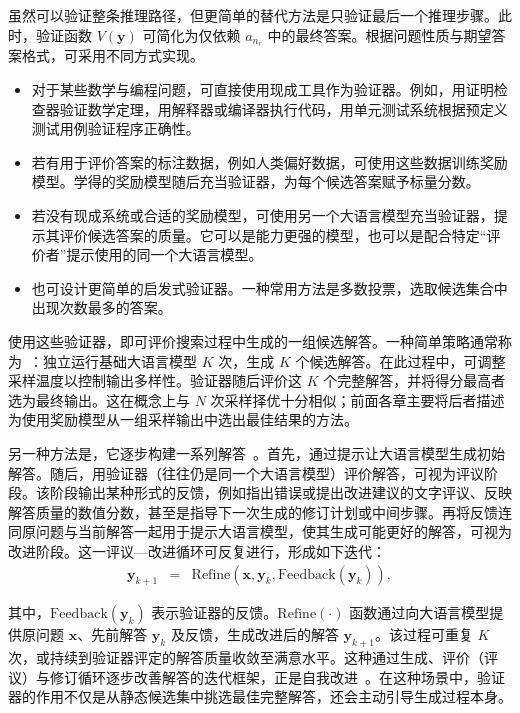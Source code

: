 虽然可以验证整条推理路径，但更简单的替代方法是只验证最后一个推理步骤。此时，验证函数 $V(\mathbf{y})$ 可简化为仅依赖 $a_{n_r}$ 中的最终答案。根据问题性质与期望答案格式，可采用不同方式实现。

\begin{itemize}
\item \vspace{0.5em} 对于某些数学与编程问题，可直接使用现成工具作为验证器。例如，用证明检查器验证数学定理，用解释器或编译器执行代码，用单元测试系统根据预定义测试用例验证程序正确性。
\item \vspace{0.3em} 若有用于评价答案的标注数据，例如人类偏好数据，可使用这些数据训练奖励模型。学得的奖励模型随后充当验证器，为每个候选答案赋予标量分数。
\item \vspace{0.3em} 若没有现成系统或合适的奖励模型，可使用另一个大语言模型充当验证器，提示其评价候选答案的质量。它可以是能力更强的模型，也可以是配合特定“评价者”提示使用的同一个大语言模型。
\item \vspace{0.3em} 也可设计更简单的启发式验证器。一种常用方法是多数投票，选取候选集合中出现次数最多的答案。
\end{itemize}
\vspace{0.3em}

使用这些验证器，即可评价搜索过程中生成的一组候选解答。一种简单策略通常称为~\cite{brown-etal:2024large,snell-etal:2024scaling}：独立运行基础大语言模型 $K$ 次，生成 $K$ 个候选解答。在此过程中，可调整采样温度以控制输出多样性。验证器随后评价这 $K$ 个完整解答，并将得分最高者选为最终输出。这在概念上与 $N$ 次采样择优十分相似；前面各章主要将后者描述为使用奖励模型从一组采样输出中选出最佳结果的方法。

另一种方法是，它逐步构建一系列解答~\cite{gou-etal:2024critic,zhang-etal:2024small}。首先，通过提示让大语言模型生成初始解答。随后，用验证器（往往仍是同一个大语言模型）评价解答，可视为评议阶段。该阶段输出某种形式的反馈，例如指出错误或提出改进建议的文字评议、反映解答质量的数值分数，甚至是指导下一次生成的修订计划或中间步骤。再将反馈连同原问题与当前解答一起用于提示大语言模型，使其生成可能更好的解答，可视为改进阶段。这一评议—改进循环可反复进行，形成如下迭代：
\begin{eqnarray}
\mathbf{y}_{k+1} & = & \mathrm{Refine}(\mathbf{x}, \mathbf{y}_k, \mathrm{Feedback}(\mathbf{y}_k)),
\end{eqnarray}

\noindent 其中，$\mathrm{Feedback}(\mathbf{y}_k)$ 表示验证器的反馈。$\mathrm{Refine}(\cdot)$ 函数通过向大语言模型提供原问题 $\mathbf{x}$、先前解答 $\mathbf{y}_k$ 及反馈，生成改进后的解答 $\mathbf{y}_{k+1}$。该过程可重复 $K$ 次，或持续到验证器评定的解答质量收敛至满意水平。这种通过生成、评价（评议）与修订循环逐步改善解答的迭代框架，正是自我改进~\cite{shinn-etal:2023reflexion,madaan-etal:2024self}。在这种场景中，验证器的作用不仅是从静态候选集中挑选最佳完整解答，还会主动引导生成过程本身。

